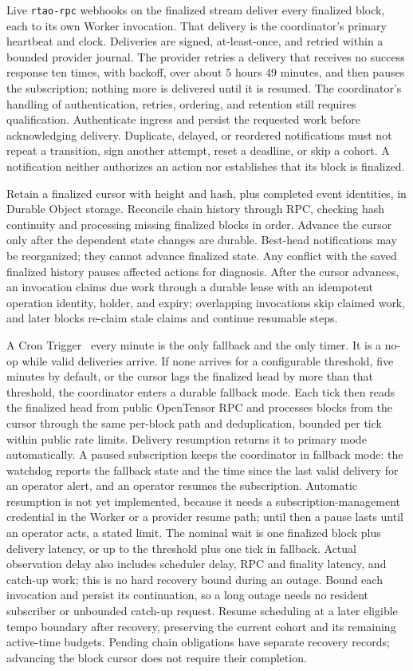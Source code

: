 Live \texttt{rtao-rpc} webhooks on the finalized stream deliver every finalized
block, each to its own Worker invocation. That delivery is the coordinator's
primary heartbeat and clock. Deliveries are signed, at-least-once, and retried
within a bounded provider journal. The provider retries a delivery that receives
no success response ten times, with backoff, over about 5 hours 49 minutes, and
then pauses the subscription; nothing more is delivered until it is resumed. The
coordinator's handling of authentication, retries, ordering, and retention still
requires qualification.
Authenticate ingress and persist the requested work before acknowledging
delivery. Duplicate, delayed, or reordered notifications must not repeat a
transition, sign another attempt, reset a deadline, or skip a cohort. A
notification neither authorizes an action nor establishes that its block is
finalized.

Retain a finalized cursor with height and hash, plus completed event identities,
in Durable Object storage. Reconcile chain history through RPC, checking hash
continuity and processing missing finalized blocks in order. Advance the cursor
only after the dependent state changes are durable. Best-head notifications may
be reorganized; they cannot advance finalized state. Any conflict with the saved
finalized history pauses affected actions for diagnosis. After the cursor
advances, an invocation claims due work through a durable lease with an
idempotent operation identity, holder, and expiry; overlapping invocations
skip claimed work, and later blocks re-claim stale claims and continue
resumable steps.

A Cron Trigger~\cite{cfcron} every minute is the only fallback and the only
timer. It is a no-op while valid deliveries arrive. If none arrives for a
configurable threshold, five minutes by default, or the cursor lags the
finalized head by more than that threshold, the coordinator enters a durable
fallback mode. Each tick then reads the finalized head from public OpenTensor
RPC and processes blocks from the cursor through the same per-block path and
deduplication, bounded per tick within public rate limits. Delivery resumption
returns it to primary mode automatically. A paused subscription keeps the
coordinator in fallback mode: the watchdog reports the fallback state and the
time since the last valid delivery for an operator alert, and an operator
resumes the subscription. Automatic resumption is not yet implemented, because it needs a
subscription-management credential in the Worker or a provider resume path; until
then a pause lasts until an operator acts, a stated limit. The nominal wait is one
finalized block plus delivery latency, or up to the threshold plus one tick in
fallback.
Actual observation delay also includes scheduler delay, RPC and finality
latency, and catch-up work; this is no hard recovery bound during an outage.
Bound each invocation and persist its continuation, so a long outage needs no
resident subscriber or unbounded catch-up request.
Resume scheduling at a later eligible tempo boundary after recovery, preserving
the current cohort and its remaining active-time budgets.
Pending chain obligations have separate recovery records; advancing the block
cursor does not require their completion.

